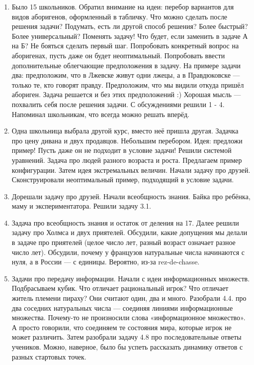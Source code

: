 \documentclass[12pt]{article}
\theoremstyle{definition}
\begin{document}
\begin{enumerate}
  \item Было 15 школьников. Обратил внимание на идеи: перебор вариантов для 
  видов аборигенов, оформленный в табличку. Что можно сделать после решения задачи?
  Подумать, есть ли другой способ решения? Более быстрый? Более универсальный?
  Поменять задачу! Что будет, если заменить в задаче А на Б? 
  Не бояться сделать первый шаг. Попробовать конкретный вопрос на аборигенах,
  пусть даже он будет неоптимальный. Попробовать ввести дополнительные облегчающие предположения в задачу.
  На примере задачи два: предположим, что в Лжевске живут одни лжецы, а в Правдюковске — только те, кто говорят правду. 
  Предположим, что мы видили откуда пришёл абориген. Задача решается и без этих предположений :)
  Хорошая мысль — похвалить себя после решения задачи. С обсуждениями решили 1 - 4. Напоминал школьникам, что всегда можно решать вперёд. 
  \item Одна школьница выбрала другой курс, вместо неё пришла другая. Задачка про цену дивана и двух продавцов. Небольшим перебором. Идея: предложи пример! Пусть даже он не подходит
  в условие задачи! Решили системой уравнений. 
  Задача про людей разного возраста и роста. Предлагаем пример конфигурации. Затем идея экстремальных величин.
  Начали задачу про друзей. Сконструировали неоптимальный пример, подходящий в условие задачи. 
  \item Дорешали задачу про друзей. Начали всеобщность знания. Байка про ребёнка, маму и экспериментатора. Решили задачу 3.1. 
  \item Задача про всеобщность знания и остаток от деления на 17. Далее решили задачу про Холмса и двух приятелей.
  Обсудили, какие допущения мы делали в задаче про приятелей (целое число лет, разный возраст означает разное число лет).
  Обсудили, почему у французов натуральные числа начинаются с нуля, а в России — с единицы. Вероятно, из-за rez-de-chasse. 
  \item Задачи про передачу информации. Начали с идеи информационных множеств. Подбрасываем кубик. Что отличает рациональный игрок? 
  Что отличает житель племени пираху? Они считают один, два и много. Разобрали 4.4. про два соседних натуральных числа — соединяя линиями информационные множества.
  Почему-то не произносили слова «информационное множество». А просто говорили, что соединяем те состояния мира, которые игрок не может различить. 
  Затем разобрали задачу 4.8 про последовательные ответы учеников. Можно, наверное, было бы успеть рассказать динамику ответов с разных стартовых точек.

\end{enumerate}
\end{document}
